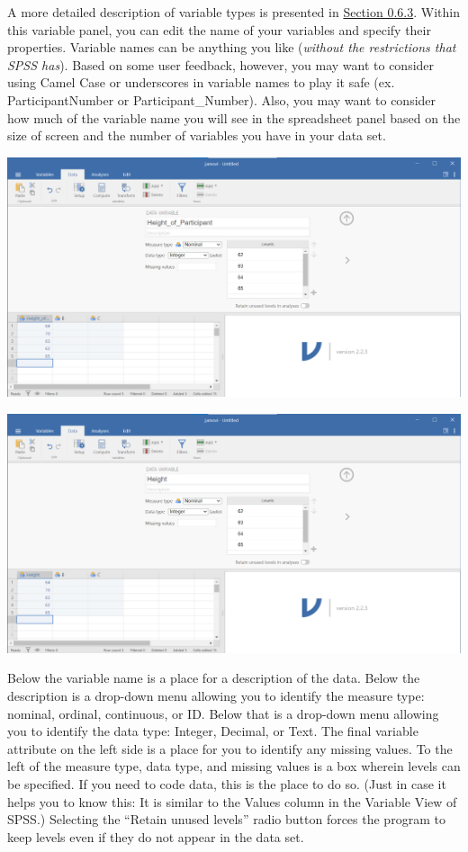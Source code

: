 \documentclass[
]{book}
\begin{document}
A more detailed description of variable types is presented in \href{https://www.erinmazerolle.com/statisticsLab/software.html\#the-spreadsheet}{Section 0.6.3}. Within this variable panel, you can edit the name of your variables and specify their properties. Variable names can be anything you like (\emph{without the restrictions that SPSS has}). Based on some user feedback, however, you may want to consider using Camel Case or underscores in variable names to play it safe (ex. ParticipantNumber or Participant\_Number). Also, you may want to consider how much of the variable name you will see in the spreadsheet panel based on the size of screen and the number of variables you have in your data set.

\includegraphics{img/1.5.2.2A.png}

\includegraphics{img/1.5.2.2B.png}

Below the variable name is a place for a description of the data. Below the description is a drop-down menu allowing you to identify the measure type: nominal, ordinal, continuous, or ID. Below that is a drop-down menu allowing you to identify the data type: Integer, Decimal, or Text. The final variable attribute on the left side is a place for you to identify any missing values. To the left of the measure type, data type, and missing values is a box wherein levels can be specified. If you need to code data, this is the place to do so. (Just in case it helps you to know this: It is similar to the Values column in the Variable View of SPSS.) Selecting the ``Retain unused levels'' radio button forces the program to keep levels even if they do not appear in the data set.
\end{document}

